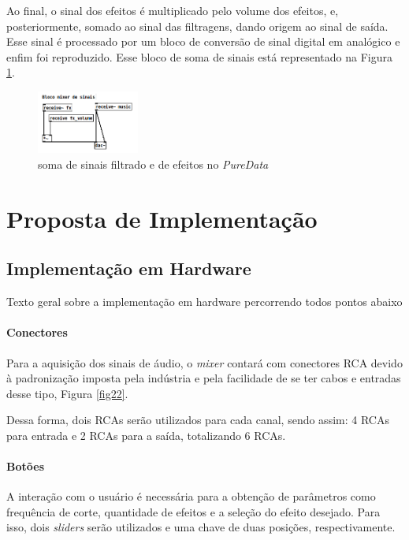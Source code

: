     Ao final, o sinal dos efeitos é multiplicado pelo volume dos efeitos, e, posteriormente, somado ao sinal das filtragens, dando origem ao sinal de saída. Esse sinal é processado por um bloco de conversão de sinal digital em analógico e enfim foi reproduzido. Esse bloco de soma de sinais está representado na Figura \ref{fig51}.

    \begin{figure}[h]
        \centering
        \includegraphics[width=0.3\textwidth]{figuras/fig51.png}
        \caption{soma de sinais filtrado e de efeitos no \textit{PureData}}
        \label{fig51}
    \end{figure}

    \section{Proposta de Implementação}


    \subsection{Implementação em Hardware}

    Texto geral sobre a implementação em hardware percorrendo todos pontos abaixo

    \paragraph{Conectores}
    Para a aquisição dos sinais de áudio, o \textit{mixer} contará com conectores RCA devido à padronização imposta pela indústria e pela facilidade de se ter cabos e entradas desse tipo, Figura \ref{fig22}.

    Dessa forma, dois RCAs serão utilizados para cada canal, sendo assim: 4 RCAs para entrada e 2 RCAs para a saída, totalizando 6 RCAs.

    \paragraph{Botões}

    A interação com o usuário é necessária para a obtenção de parâmetros como frequência de corte, quantidade de efeitos e a seleção do efeito desejado. Para isso, dois \textit{sliders} serão utilizados e uma chave de duas posições, respectivamente. 

